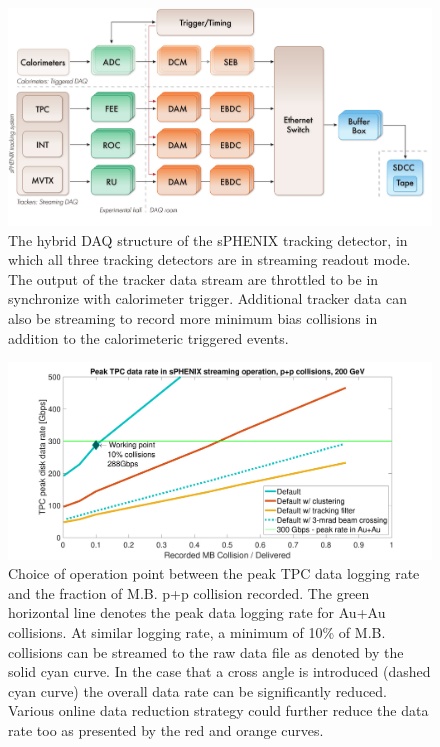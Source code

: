 \begin{figure}[htbp]
\begin{center}
\includegraphics[width=.7\linewidth]{figs/DAQ structure_rev3.pdf}
\caption{The hybrid DAQ structure of the sPHENIX tracking detector, in which  all three tracking detectors are in streaming readout mode. The output of the tracker data stream are throttled to be in synchronize with calorimeter trigger. Additional tracker data can also be streaming to record more minimum bias collisions in addition to the calorimeteric triggered events.}
\label{fig:TPC-DAQ-structure}
\end{center}
\end{figure}
\begin{figure}[htbp]
\begin{center}
\includegraphics[width=.7\linewidth]{figs/TPCRateLayeredPP_Summary_13MHz_TriggerWindowRateCoverageCompile.pdf}
\caption{Choice of operation point between the peak TPC data logging rate and the fraction of M.B. p+p collision recorded. The green horizontal line denotes the peak data logging rate for Au+Au collisions. At similar logging rate, a minimum of 10\% of \pp M.B. collisions can be streamed to the raw data file as denoted by the solid cyan curve. In the case that a cross angle is introduced (dashed cyan curve) the overall data rate can be significantly reduced. Various online data reduction strategy could further reduce the data rate too as presented by the red and orange curves.}
\label{fig:TPC-DAQ-rate}
\end{center}
\end{figure}
 
